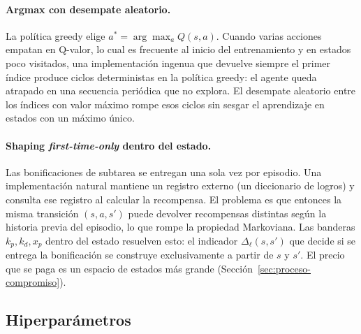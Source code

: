 \documentclass[11pt,a4paper]{article}
\begin{document}
\paragraph{Argmax con desempate aleatorio.}
La política greedy elige
\(a^* = \arg\max_a Q(s, a)\). Cuando varias acciones empatan en
Q-valor, lo cual es frecuente al inicio del entrenamiento y en estados
poco visitados, una implementación ingenua que devuelve siempre el
primer índice produce ciclos deterministas en la política greedy: el
agente queda atrapado en una secuencia periódica que no explora. El
desempate aleatorio entre los índices con valor máximo rompe esos
ciclos sin sesgar el aprendizaje en estados con un máximo único.

\paragraph{Shaping \emph{first-time-only} dentro del estado.}
Las bonificaciones de subtarea se entregan una sola vez por episodio.
Una implementación natural mantiene un registro externo (un diccionario
de logros) y consulta ese registro al calcular la recompensa. El
problema es que entonces la misma transición \((s, a, s')\) puede
devolver recompensas distintas según la historia previa del episodio,
lo que rompe la propiedad Markoviana. Las banderas \(k_p, k_d, x_p\)
dentro del estado resuelven esto: el indicador
\(\Delta_\ell(s, s')\) que decide si se entrega la bonificación se
construye exclusivamente a partir de \(s\) y \(s'\). El precio que se
paga es un espacio de estados más grande
(Sección~\ref{sec:proceso-compromiso}).

\subsection{Hiperparámetros}
\end{document}
